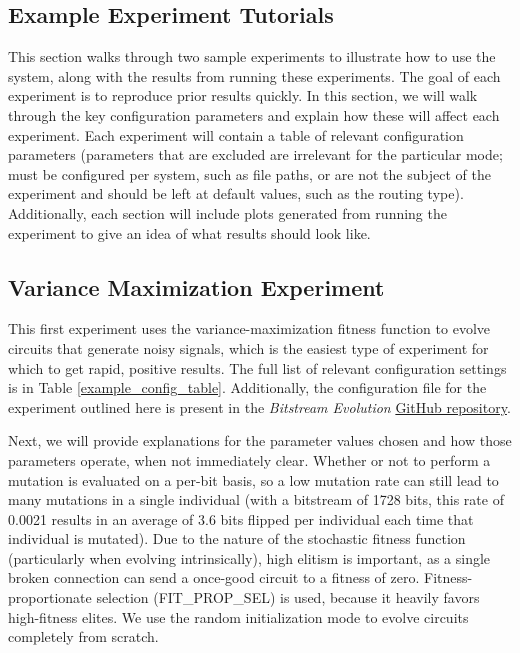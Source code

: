 \documentclass{ieeeaccess}
\begin{document}
\begin{appendices}
\section{\break Example Experiment Tutorials} \label{sec_walkthrough}
This section walks through two sample experiments to illustrate how to use the system, along with the results from running these experiments. The goal of each experiment is to reproduce prior results quickly. In this section, we will walk through the key configuration parameters and explain how these will affect each experiment. Each experiment will contain a table of relevant configuration parameters (parameters that are excluded are irrelevant for the particular mode; must be configured per system, such as file paths, or are not the subject of the experiment and should be left at default values, such as the routing type). Additionally, each section will include plots generated from running the experiment to give an idea of what results should look like.




\clearpage
\newpage


\subsection{Variance Maximization Experiment}
\label{sec_var_max_results}
This first experiment uses the variance-maximization fitness function to evolve circuits that generate noisy signals, which is the easiest type of experiment for which to get rapid, positive results. The full list of relevant configuration settings is in Table \ref{example_config_table}. Additionally, the configuration file for the experiment outlined here is present in the \textit{Bitstream Evolution} \href{https://github.com/evolvablehardware/BitstreamEvolution/blob/main/data/example_configs/variance_maximization.ini}{GitHub repository}. 


Next, we will provide explanations for the parameter values chosen and how those parameters operate, when not immediately clear. Whether or not to perform a mutation is evaluated on a per-bit basis, so a low mutation rate can still lead to many mutations in a single individual (with a bitstream of 1728 bits, this rate of 0.0021 results in an average of 3.6 bits flipped per individual each time that individual is mutated). Due to the nature of the stochastic fitness function (particularly when evolving intrinsically), high elitism is important, as a single broken connection can send a once-good circuit to a fitness of zero. Fitness-proportionate selection (FIT\_PROP\_SEL) is used, because it heavily favors high-fitness elites.
We use the random initialization mode to evolve circuits completely from scratch.


\end{appendices}
\end{document}
